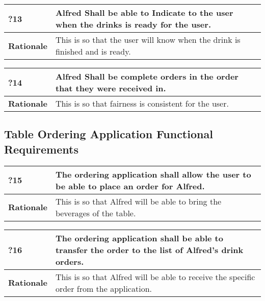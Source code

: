 \documentclass [11pt]{article}
\begin{document}
\begin{longtable}{| p{ } | p{ } | }\hline 
	\rowcolor{tableCell}\textbf{?13} & Alfred Shall be able to Indicate to the user when the drinks is ready for the user. \\ \hline
	\textbf{Rationale} &  This is so that the user will know when the drink is finished and is ready.\\ \hline 
\end{longtable}

\begin{longtable}{| p{ } | p{ } | }\hline 
	\rowcolor{tableCell}\textbf{?14} & Alfred Shall be complete orders in the order that they were received in. \\ \hline
	\textbf{Rationale} &  This is so that fairness is consistent for the user.\\ \hline 
\end{longtable}

\subsection{Table Ordering Application Functional Requirements}

\begin{longtable}{| p{ } | p{ } | }\hline 
	\rowcolor{tableCell}\textbf{?15} & The ordering application shall allow the user to be able to place an order for Alfred. \\ \hline
	\textbf{Rationale} &  This is so that Alfred will be able to bring the beverages of the table.\\ \hline 
\end{longtable}


\begin{longtable}{| p{ } | p{ } | }\hline 
	\rowcolor{tableCell}\textbf{?16} & The ordering application shall be able to transfer the order to the list of Alfred's drink orders. \\ \hline
	\textbf{Rationale} &  This is so that Alfred will be able to receive the specific order from the application.\\ \hline 
\end{longtable}

\end{document}
